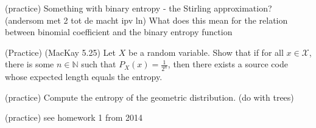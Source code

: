\documentclass[a4paper,10pt,landscape,twocolumn]{scrartcl}
\begin{document}
\begin{exercise}[]
(practice) Something with binary entropy - the Stirling approximation? (andersom met 2 tot de macht ipv ln) What does this mean for the relation between binomial coefficient and the binary entropy function
\end{exercise}

\begin{exercise}
(Practice)
(MacKay 5.25) Let $X$ be a random variable. Show that if for all $x \in \mathcal{X}$, there is some $n \in \mathbb{N}$ such that $P_X(x) = \frac{1}{2^n}$, then there exists a source code whose expected length equals the entropy. 
\end{exercise}


\begin{exercise}
(practice) Compute the entropy of the geometric distribution. (do with trees)
\end{exercise}

\begin{exercise}
(practice) see homework 1 from 2014
\end{exercise}
\end{document}
